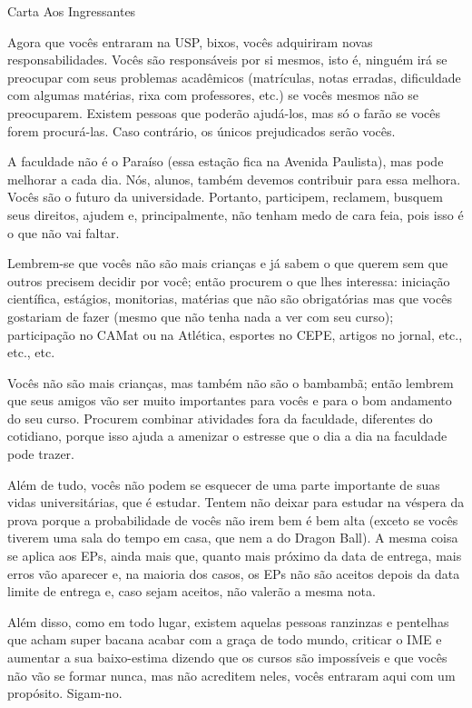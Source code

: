 \begin{editorial}{Carta Aos Ingressantes}

Agora que vocês entraram na USP, bixos, vocês adquiriram novas
responsabilidades.  Vocês são responsáveis por si mesmos, isto é, ninguém irá se
preocupar com seus problemas acadêmicos (matrículas, notas erradas, dificuldade
com algumas matérias, rixa com professores, etc.) se vocês mesmos não se
preocuparem. Existem pessoas que poderão ajudá-los, mas só o farão se vocês
forem procurá-las. Caso contrário, os únicos prejudicados serão vocês.

A faculdade não é o Paraíso (essa estação fica na Avenida Paulista), mas pode
melhorar a cada dia. Nós, alunos, também devemos contribuir para essa melhora.
Vocês são o futuro da universidade. Portanto, participem, reclamem, busquem seus
direitos, ajudem e, principalmente, não tenham medo de cara feia, pois isso é o
que não vai faltar.

Lembrem-se que vocês não são mais crianças e já sabem o que querem sem que
outros precisem decidir por você; então procurem o que lhes interessa: iniciação
científica, estágios, monitorias, matérias que não são obrigatórias mas que
vocês gostariam de fazer (mesmo que não tenha nada a ver com seu curso);
participação no CAMat ou na Atlética, esportes no CEPE, artigos no jornal, etc.,
etc., etc.

Vocês não são mais crianças, mas também não são o bambambã; então lembrem que
seus amigos vão ser muito importantes para vocês e para o bom andamento do seu
curso. Procurem combinar atividades fora da faculdade, diferentes do cotidiano,
porque isso ajuda a amenizar o estresse que o dia a dia na faculdade pode
trazer.

Além de tudo, vocês não podem se esquecer de uma parte importante de suas vidas
universitárias, que é estudar. Tentem não deixar para estudar na véspera da
prova porque a probabilidade de vocês não irem bem é bem alta (exceto se vocês
tiverem uma sala do tempo em casa, que nem a do Dragon Ball). A mesma coisa se
aplica aos EPs, ainda mais que, quanto mais próximo da data de entrega, mais
erros vão aparecer e, na maioria dos casos, os EPs não são aceitos depois da
data limite de entrega e, caso sejam aceitos, não valerão a mesma nota.

Além disso, como em todo lugar, existem aquelas pessoas ranzinzas e pentelhas
que acham super bacana acabar com a graça de todo mundo, criticar o IME e
aumentar a sua baixo-estima dizendo que os cursos são impossíveis e que vocês
não vão se formar nunca, mas não acreditem neles, vocês entraram aqui com um
propósito. Sigam-no.


\end{editorial}
